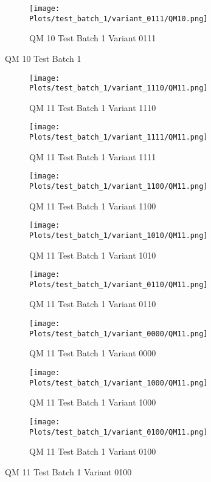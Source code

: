 \documentclass{DissertateFigs}
\begin{document}
\begin{figure}[t!]
\medskip

    \begin{subfigure}{0.47\textwidth}
    \texttt{[image: Plots/test\_batch\_1/variant\_0111/QM10.png]}
    \caption{QM 10 Test Batch 1 Variant 0111}
    \end{subfigure}
\caption{QM 10 Test Batch 1}
    \end{figure}
\clearpage
\begin{figure}[t!]
    \begin{subfigure}{0.47\textwidth}
    \texttt{[image: Plots/test\_batch\_1/variant\_1110/QM11.png]}
    \caption{QM 11 Test Batch 1 Variant 1110}
    \end{subfigure}
    \begin{subfigure}{0.47\textwidth}
    \texttt{[image: Plots/test\_batch\_1/variant\_1111/QM11.png]}
    \caption{QM 11 Test Batch 1 Variant 1111}
    \end{subfigure}

\medskip

    \begin{subfigure}{0.47\textwidth}
    \texttt{[image: Plots/test\_batch\_1/variant\_1100/QM11.png]}
    \caption{QM 11 Test Batch 1 Variant 1100}
    \end{subfigure}
    \begin{subfigure}{0.47\textwidth}
    \texttt{[image: Plots/test\_batch\_1/variant\_1010/QM11.png]}
    \caption{QM 11 Test Batch 1 Variant 1010}
    \end{subfigure}

\medskip

    \begin{subfigure}{0.47\textwidth}
    \texttt{[image: Plots/test\_batch\_1/variant\_0110/QM11.png]}
    \caption{QM 11 Test Batch 1 Variant 0110}
    \end{subfigure}
    \begin{subfigure}{0.47\textwidth}
    \texttt{[image: Plots/test\_batch\_1/variant\_0000/QM11.png]}
    \caption{QM 11 Test Batch 1 Variant 0000}
    \end{subfigure}

\medskip

    \begin{subfigure}{0.47\textwidth}
    \texttt{[image: Plots/test\_batch\_1/variant\_1000/QM11.png]}
    \caption{QM 11 Test Batch 1 Variant 1000}
    \end{subfigure}
    \begin{subfigure}{0.47\textwidth}
    \texttt{[image: Plots/test\_batch\_1/variant\_0100/QM11.png]}
    \caption{QM 11 Test Batch 1 Variant 0100}
    \end{subfigure}


\end{figure}
\end{document}
